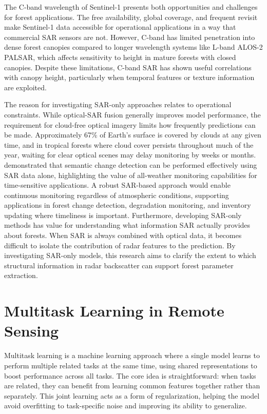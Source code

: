 The C-band wavelength of Sentinel-1 presents both opportunities and challenges for forest applications. The free availability, global coverage, and frequent revisit make Sentinel-1 data accessible for operational applications in a way that commercial SAR sensors are not. However, C-band has limited penetration into dense forest canopies compared to longer wavelength systems like L-band ALOS-2 PALSAR, which affects sensitivity to height in mature forests with closed canopies. Despite these limitations, C-band SAR has shown useful correlations with canopy height, particularly when temporal features or texture information are exploited.

The reason for investigating SAR-only approaches relates to operational constraints. While optical-SAR fusion generally improves model performance, the requirement for cloud-free optical imagery limits how frequently predictions can be made. Approximately 67\% of Earth's surface is covered by clouds at any given time, and in tropical forests where cloud cover persists throughout much of the year, waiting for clear optical scenes may delay monitoring by weeks or months. \cite{wu_segcr_2025} demonstrated that semantic change detection can be performed effectively using SAR data alone, highlighting the value of all-weather monitoring capabilities for time-sensitive applications. A robust SAR-based approach would enable continuous monitoring regardless of atmospheric conditions, supporting applications in forest change detection, degradation monitoring, and inventory updating where timeliness is important. Furthermore, developing SAR-only methods has value for understanding what information SAR actually provides about forests. When SAR is always combined with optical data, it becomes difficult to isolate the contribution of radar features to the prediction. By investigating SAR-only models, this research aims to clarify the extent to which structural information in radar backscatter can support forest parameter extraction.

\section{Multitask Learning in Remote Sensing}
\label{sec:mtl_rs}

Multitask learning is a machine learning approach where a single model learns to perform multiple related tasks at the same time, using shared representations to boost performance across all tasks. The core idea is straightforward: when tasks are related, they can benefit from learning common features together rather than separately. This joint learning acts as a form of regularization, helping the model avoid overfitting to task-specific noise and improving its ability to generalize.

